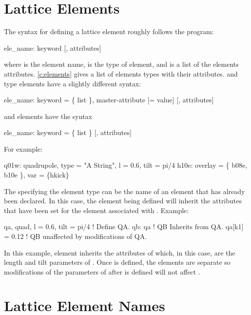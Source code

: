 \section{Lattice Elements}

The syntax for defining a lattice element roughly follows the
\mad\cite{b:maduser} program:
\begin{example}
  ele_name: keyword [, attributes]
\end{example}
where  is the element name,  is the type of element, and  is
a list of the elements attributes. \cref{c:elements} gives a list of elements types with their
attributes.   and  type elements have a slightly different syntax:
\begin{example}
  ele_name: keyword = \{ list \}, master-attribute [= value] [, attributes]
\end{example}
and  elements have the syntax
\begin{example}
  ele_name: keyword = \{ list \} [, attributes]
\end{example}  
For example:
\begin{example}
  q01w: quadrupole, type = "A String", l = 0.6, tilt = pi/4
  h10e: overlay = \{ b08e, b10e \}, var = \{hkick\}
\end{example}

The  specifying the element type can be the name of an element that has already been
declared. In this case, the element being defined will inherit the attributes that have been
set for the element associated with . Example:
\begin{example}
  qa, quad, l = 0.6, tilt = pi/4  ! Define QA.
  qb: qa                          ! QB Inherits from QA.
  qa[k1] = 0.12                   ! QB unaffected by modifications of QA.
\end{example}
In this example, element  inherits the attributes of  which, in this case, are the
length and tilt parameters of . Once  is defined, the elements are separate so 
modifications of the parameters of  after  is defined will not affect .

\section{Lattice Element Names}
\label{s:ele.names}


